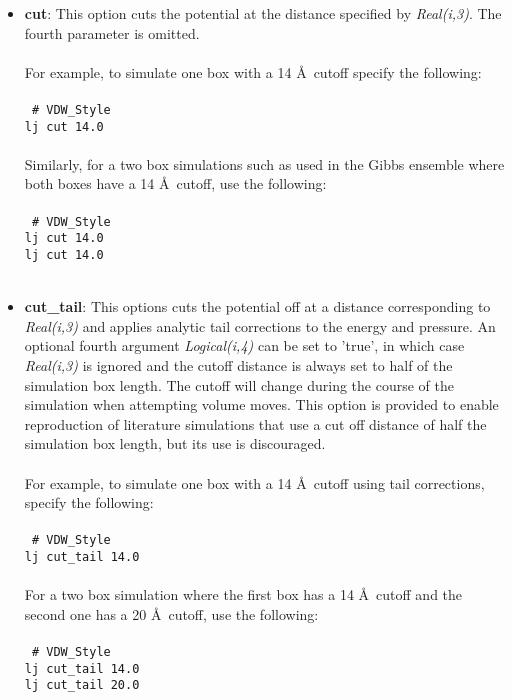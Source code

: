 \begin{itemize}
\item \textbf{cut}: This option cuts the  potential at the distance
specified by \emph{Real(i,3)}. The fourth parameter is omitted. \\ \\
%
For example, to simulate one box with a 14 \AA\ cutoff specify the following:
\\ \\
\texttt{
\# VDW\_Style \\
lj cut 14.0 } \\ \\
%
Similarly, for a two box simulations such as used in the Gibbs
ensemble where both boxes have a 14 \AA\ cutoff, use the
following: \\ \\
\texttt{
\# VDW\_Style \\
lj cut 14.0 \\
lj cut 14.0 } \\ \\
%
\item \textbf{cut\_tail}: This options cuts the potential off at a distance
corresponding to \emph{Real(i,3)} and applies analytic tail
corrections to the energy and pressure. An optional fourth argument
\emph{Logical(i,4)} can be set 
to 'true', in which case \emph{Real(i,3)} is ignored and the cutoff
distance is always set to half of the simulation box length. The
cutoff will change during the course of the simulation when attempting
volume moves.  This option is provided to enable reproduction of
literature simulations that use a cut off distance of half the
simulation box length, but its use is discouraged. \\ \\ 
%
For example, to simulate one box with a 14 \AA\ cutoff using tail
corrections, specify the following:
\\ \\
\texttt{
\# VDW\_Style \\
lj cut\_tail 14.0 } \\ \\
%
For a two box simulation where the first box has a 14 \AA\ cutoff and
the second one has a 20 \AA\ cutoff, use the
following:
\\ \\
\texttt{
\# VDW\_Style \\
lj cut\_tail 14.0 \\ 
lj cut\_tail 20.0 } \\ \\

\end{itemize}
